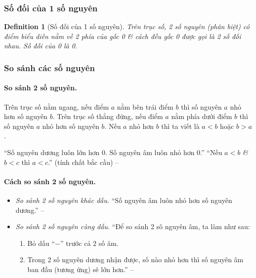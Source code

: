 \documentclass{article}
\numberwithin{equation}{section}
\newtheorem{definition}{Definition}[section]
\begin{document}
\subsubsection{Số đối của 1 số nguyên}

\begin{definition}[Số đối của 1 số nguyên]
	Trên trục số, 2 số nguyên (phân biệt) có điểm biểu diễn nằm về 2 phía của gốc 0 \textit{\&} cách đều gốc 0 được gọi là \emph{2 số đối nhau}. Số đối của 0 là 0.
\end{definition}

\subsubsection{So sánh các số nguyên}

\paragraph{So sánh 2 số nguyên.}
\noindent\begin{tcolorbox}
	Trên trục số nằm ngang, nếu điểm $a$ nằm bên trái điểm $b$ thì số nguyên $a$ nhỏ hơn số nguyên $b$. Trên trục số thẳng đứng, nếu điểm $a$ nằm phía dưới điểm $b$ thì số nguyên $a$ nhỏ hơn số nguyên $b$. Nếu $a$ nhỏ hơn $b$ thì ta viết là $a < b$ hoặc $b > a$.
\end{tcolorbox}
``Số nguyên dương luôn lớn hơn 0. Số nguyên âm luôn nhỏ hơn 0.'' ``Nếu $a < b$ \textit{\&} $b < c$ thì $a < c$.'' (tính chất bắc cầu) -- \cite[p. 67]{Thai_Anh_Dat_Ha_Loan_Nam_Quang_Toan_6_tap_1}

\paragraph{Cách so sánh 2 số nguyên.}
\begin{itemize}
	\item \textit{So sánh 2 số nguyên khác dấu.} ``Số nguyên âm luôn nhỏ hơn số nguyên dương.'' -- \cite[p. 68]{Thai_Anh_Dat_Ha_Loan_Nam_Quang_Toan_6_tap_1}
	\item \textit{So sánh 2 số nguyên cùng dấu.} ``Để so sánh 2 sô nguyên âm, ta làm như sau:
	\begin{enumerate}
		\item Bỏ dấu ``$-$'' trước cả 2 số âm.
		\item Trong 2 số nguyên dương nhận được, số nào nhỏ hơn thì số nguyên âm ban đầu (tương ứng) sẽ lớn hơn.'' -- \cite[p. 69]{Thai_Anh_Dat_Ha_Loan_Nam_Quang_Toan_6_tap_1}
	\end{enumerate}
\end{itemize}
\end{document}
